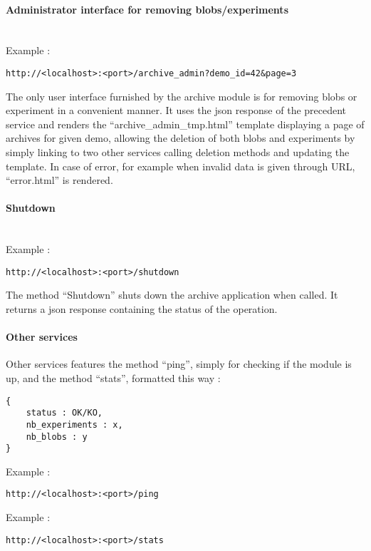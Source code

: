 \paragraph{Administrator interface for removing blobs/experiments} \hspace{0pt} \\
Example :
\begin{verbatim}
http://<localhost>:<port>/archive_admin?demo_id=42&page=3
\end{verbatim}
The only user interface furnished by the archive module is for removing blobs or experiment in a convenient manner. It uses the json response of the precedent service and renders the ``archive\_admin\_tmp.html'' template displaying a page of archives for given demo, allowing the deletion of both blobs and experiments by simply linking to two other services calling deletion methods and updating the template. In case of error, for example when invalid data is given through URL, ``error.html'' is rendered.

\paragraph{Shutdown} \hspace{0pt} \\
Example :
\begin{verbatim}
http://<localhost>:<port>/shutdown
\end{verbatim}
The method ``Shutdown'' shuts down the archive application when called. It returns a json response containing the status of the operation.

\paragraph{Other services}
Other services features the method ``ping'', simply for checking if the module is up, and the method ``stats'', formatted this way :
\begin{verbatim}
{
    status : OK/KO,
    nb_experiments : x,
    nb_blobs : y
}
\end{verbatim}
Example :
\begin{verbatim}
http://<localhost>:<port>/ping
\end{verbatim}
Example :
\begin{verbatim}
http://<localhost>:<port>/stats
\end{verbatim}
